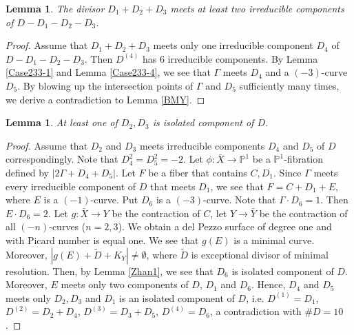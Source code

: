 \documentclass[10pt,oneside,reqno]{amsart}
\newcommand{\pp}{\mathbb{P}}
\newtheorem{lemma}[theorem]{Lemma}
\theoremstyle{definition}
\theoremstyle{remark}
\numberwithin{equation}{section}
\begin{document}
\begin{lemma}
\label{Case233-8}
The divisor $D_1+D_2+D_3$ meets at least two irreducible components of $D-D_1-D_2-D_3$.
\end{lemma}

\begin{proof}
Assume that $D_1+D_2+D_3$ meets only one irreducible component $D_4$ of $D-D_1-D_2-D_3$. Then $D^(4)$ has $6$ irreducible components.  By Lemma \ref{Case233-1} and Lemma  \ref{Case233-4}, we see that $\Gamma$ meets $D_4$ and a $(-3)$-curve $D_5$. By blowing up the intersection points of $\Gamma$ and $D_5$ sufficiently many times, we derive a contradiction to Lemma \ref{BMY}.
\end{proof}

\begin{lemma}
\label{Case233-9}
At least one of $D_2, D_3$ is isolated component of $D$.
\end{lemma}

\begin{proof}
Assume that $D_2$ and $D_3$ meets irreducible components $D_4$ and $D_5$ of $D$ correspondingly. Note that $D_4^2=D_5^2=-2$. Let $\phi\colon\bar{X}\rightarrow\pp^1$ be a $\pp^1$-fibration defined by $|2\Gamma+D_4+D_5|$. Let $F$ be a fiber that contains $C, D_1$. Since $\Gamma$ meets every irreducible component of $D$ that meets $D_1$, we see that $F=C+D_1+E$, where $E$ is a $(-1)$-curve. Put $D_6$ is a $(-3)$-curve. Note that $\Gamma\cdot D_6=1$. Then $E\cdot D_6=2$. Let $g\colon\bar{X}\rightarrow Y$ be the contraction of $C$, let $Y\rightarrow\bar{Y}$ be the contraction of all $(-n)$-curves ($n=2,3$). We obtain a del Pezzo surface of degree one and with Picard number is equal one. We see that $g(E)$ is a minimal curve. Moreover, $|g(E)+\tilde{D}+K_Y|\neq\emptyset$, where $\tilde{D}$ is exceptional divisor of minimal resolution. Then, by Lemma \ref{Zhan1}, we see that $D_6$ is isolated component of $D$. Moreover, $E$ meets only two components of $D$, $D_1$ and $D_6$. Hence, $D_4$ and $D_5$ meets only $D_2, D_3$ and $D_1$ is an isolated component of $D$, i.e. $D^{(1)}=D_1$, $D^{(2)}=D_2+D_4$, $D^{(3)}=D_3+D_5$, $D^{(4)}=D_6$, a contradiction with $\#D=10$.
\end{proof}
\end{document}
